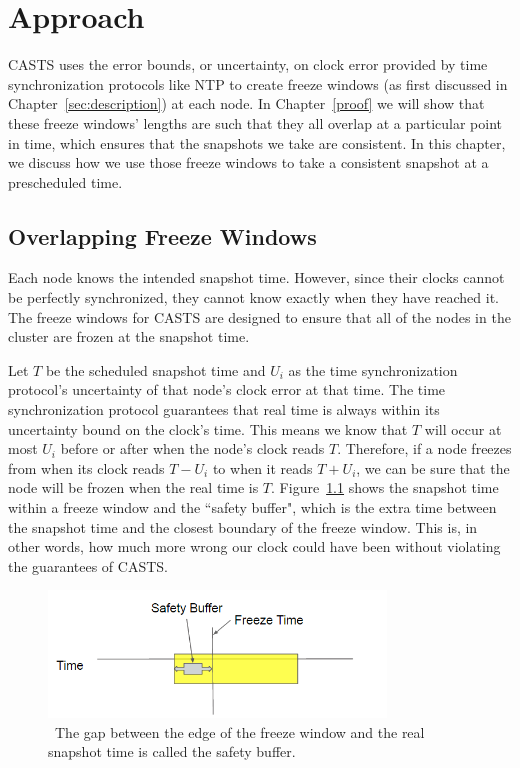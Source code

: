 \chapter{Approach}
\label{sec:approach}

CASTS uses the error bounds, or uncertainty, on clock
error provided by time synchronization protocols like NTP to create
freeze windows (as first discussed in Chapter~\ref{sec:description})
at each node. In Chapter~\ref{proof} we will show that these freeze
windows' lengths are such that they all overlap at a particular point
in time, which ensures that the snapshots we take are consistent. In
this chapter, we discuss how we use those freeze windows to take a
consistent snapshot at a prescheduled time.

\section{Overlapping Freeze Windows}
\label{sec:overlapping}

Each node knows the intended snapshot time. However, since their
clocks cannot be perfectly synchronized, they cannot know exactly when
they have reached it. The freeze windows for CASTS are
designed to ensure that all of the nodes in the cluster are frozen at
the snapshot time.

Let $T$ be the scheduled snapshot time and $U_i$ as the time
synchronization protocol's uncertainty of that node's clock error at
that time. The time synchronization protocol guarantees that real time
is always within its uncertainty bound on the clock's time. This means
we know that $T$ will occur at most $U_i$ before or after when the
node's clock reads $T$. Therefore, if a node freezes from when its
clock reads $T - U_i$ to when it reads $T + U_i$, we can be sure that
the node will be frozen when the real time is $T$.
Figure~\ref{fig:safety-buff} shows the snapshot time within a freeze
window and the ``safety buffer", which is the extra time between the
snapshot time and the closest boundary of the freeze window. This is,
in other words, how much more wrong our clock could have been without
violating the guarantees of CASTS.

\begin{figure}
\includegraphics[width=0.8\textwidth]{safety-diagram.png}
\caption{~The gap between the edge of the freeze window and the real snapshot time is called the safety buffer.}
\label{fig:safety-buff}
\end{figure}


